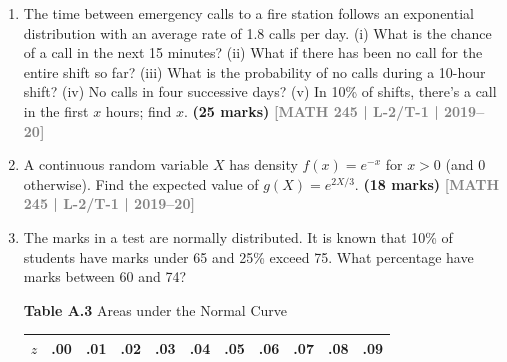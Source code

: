 \documentclass[12pt,a4paper]{article}
\newcommand{\yr}[1]{\hfill\textcolor{gray}{\small\textbf{[#1]}}}
\newcommand{\mk}[1]{\textcolor{orange!70!black}{\small\textbf{(#1 marks)}}}
\begin{document}
\begin{enumerate}
\item The time between emergency calls to a fire station follows an exponential distribution with an average rate of 1.8 calls per day. (i) What is the chance of a call in the next 15 minutes? (ii) What if there has been no call for the entire shift so far? (iii) What is the probability of no calls during a 10-hour shift? (iv) No calls in four successive days? (v) In 10\% of shifts, there's a call in the first $x$ hours; find $x$.
\mk{25} \yr{MATH 245 | L-2/T-1 | 2019--20}

\item A continuous random variable $X$ has density $f(x)=e^{-x}$ for $x>0$ (and 0 otherwise). Find the expected value of $g(X)=e^{2X/3}$.
\mk{18} \yr{MATH 245 | L-2/T-1 | 2019--20}

\item The marks in a test are normally distributed. It is known that 10\% of students have marks under 65 and 25\% exceed 75. What percentage have marks between 60 and 74?

\begin{center}
\end{center}

\vspace{0.3cm}
\noindent\textbf{Table A.3} Areas under the Normal Curve
\vspace{0.2cm}

\begin{center}
\small
\begin{longtable}{ccccccccccc}
\toprule\toprule
$z$ & .00 & .01 & .02 & .03 & .04 & .05 & .06 & .07 & .08 & .09 \\
\midrule
\endhead %


\end{longtable}
\end{center}
\end{enumerate}
\end{document}
